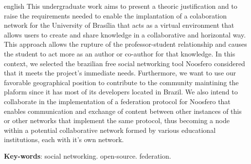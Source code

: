 \begin{resumo}[Abstract]
 \begin{otherlanguage*}{english}   
   This undergraduate work aims to present a theoric justification and to raise
   the requirements needed to enable the implantation of a colaboration network
   for the University of Brasília that acts as a virtual environment that allows
   users to create and share knowledge in a collaborative and horizontal way.
   This approach allows the rupture of the professor-student relationship and
   causes the student to act more as an author or co-author for that
   knowledge.
   In this context, we selected the brazilian free social networking tool
   Noosfero considered that it meets the project's immediate needs. Furthermore,
   we want to use our favorable geographical position to contribute to the
   community maintining the plaform since it has most of its developers located
   in Brazil.
   We also intend to collaborate in the implementation of a federation protocol
   for Noosfero that enables communication and exchange of content between
   other instances of this or other networks that implement the same protocol,
   thus becoming a node within a potential collaborative network formed by
   various educational institutions, each with it's own network.
   

   \vspace{\onelineskip}
 
   \noindent 
   \textbf{Key-words}: social networking. open-source. federation.
 \end{otherlanguage*}
\end{resumo}